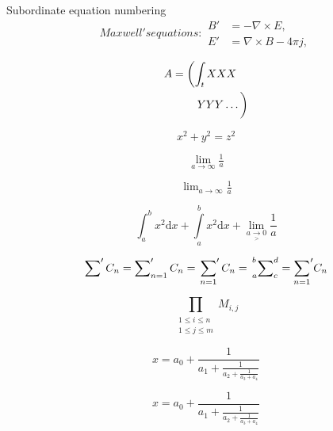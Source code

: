 \documentclass{book}
\begin{document}
Subordinate equation numbering
\begin{subequations}
Maxwell's equations:
\begin{align}
        B'&=-\nabla \times E,\\
        E'&=\nabla \times B - 4\pi j,
\end{align}
\end{subequations}

\begin{align}
 A &=     \left(\int_t XXX       \right.\nonumber\\
   &\qquad \left.\vphantom{\int_t} YYY \dots \right)
\end{align}

\begin{equation}
 \boxed{x^2+y^2 = z^2}
\end{equation}

\begin{equation}
  \lim_{a\to \infty} \tfrac{1}{a}
\end{equation}

\begin{equation}
  \lim\nolimits_{a\to \infty} \tfrac{1}{a}
\end{equation}

\begin{equation}
  \int_a^b x^2  \mathrm{d} x  + \int\limits_a^b x^2  \mathrm{d} x +  \lim_{a \underset{>}{\to} 0} \frac{1}{a}
\end{equation}

\begin{equation}
  \sum\nolimits' C_n = 
  \sum_{n=1}\nolimits' C_n =
  \sideset{}{'}\sum_{n=1}C_n =
  \sideset{_a^b}{_c^d}\sum =
  {\sum\limits_{n=1} }'C_n
\end{equation}

\begin{equation}
  \prod_{\substack{
            1\le i \le n\\
            1\le j \le m}}
     M_{i,j}
\end{equation}

\begin{equation}
  x = a_0 + \frac{1}{a_1 + \frac{1}{a_2 + \frac{1}{a_3 + a_4}}}
\end{equation}

\begin{equation}
  x = a_0 + \frac{1}{\displaystyle a_1 
          + \frac{1}{\displaystyle a_2 
          + \frac{1}{\displaystyle a_3 + a_4}}}
\end{equation}
\end{document}
